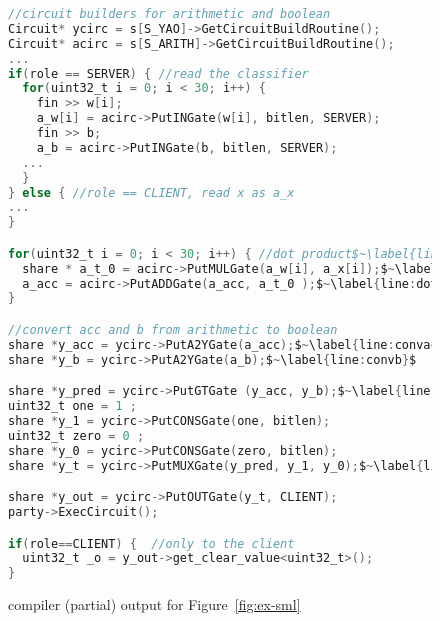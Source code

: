 \begin{figure}
\begin{lstlisting}[language=C, mathescape=true]
//circuit builders for arithmetic and boolean
Circuit* ycirc = s[S_YAO]->GetCircuitBuildRoutine();
Circuit* acirc = s[S_ARITH]->GetCircuitBuildRoutine();
...
if(role == SERVER) { //read the classifier
  for(uint32_t i = 0; i < 30; i++) {
    fin >> w[i];
    a_w[i] = acirc->PutINGate(w[i], bitlen, SERVER);
    fin >> b;
    a_b = acirc->PutINGate(b, bitlen, SERVER); 
  ...
  }
} else { //role == CLIENT, read x as a_x
...
}

for(uint32_t i = 0; i < 30; i++) { //dot product$~\label{line:dotproductloop}$
  share * a_t_0 = acirc->PutMULGate(a_w[i], a_x[i]);$~\label{line:dotmulgate}$
  a_acc = acirc->PutADDGate(a_acc, a_t_0 );$~\label{line:dotaddgate}$
}

//convert acc and b from arithmetic to boolean
share *y_acc = ycirc->PutA2YGate(a_acc);$~\label{line:convacc}$
share *y_b = ycirc->PutA2YGate(a_b);$~\label{line:convb}$

share *y_pred = ycirc->PutGTGate (y_acc, y_b);$~\label{line:condyaobegin}$
uint32_t one = 1 ;
share *y_1 = ycirc->PutCONSGate(one, bitlen);
uint32_t zero = 0 ;
share *y_0 = ycirc->PutCONSGate(zero, bitlen);
share *y_t = ycirc->PutMUXGate(y_pred, y_1, y_0);$~\label{line:condyaoend}$

share *y_out = ycirc->PutOUTGate(y_t, CLIENT);
party->ExecCircuit();

if(role==CLIENT) {  //only to the client
  uint32_t _o = y_out->get_clear_value<uint32_t>();
}
\end{lstlisting}
\caption{\tool compiler (partial) output for Figure~\ref{fig:ex-sml}}
\label{fig:ex-aby}
\end{figure}
